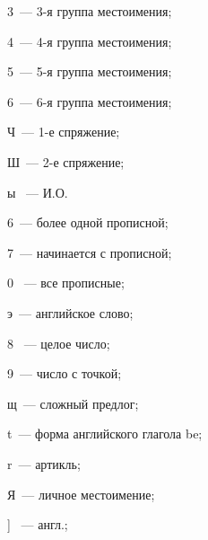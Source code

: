 3~---  3-я группа местоимения;





4~---  4-я группа местоимения;





5~--- 5-я группа местоимения;





6~---  6-я группа местоимения;





Ч~--- 1-е спряжение;





Ш~--- 2-е спряжение;





ы ~--- И.О.





6~--- более одной прописной;





7~--- начинается с прописной;





0 ~--- все прописные;





э~--- английское слово;





8 ~--- целое число;





9~--- число с точкой;





щ~--- сложный предлог;





t~--- форма английского глагола be;





r~--- артикль;





Я~--- личное местоимение;





] ~--- англ.;





